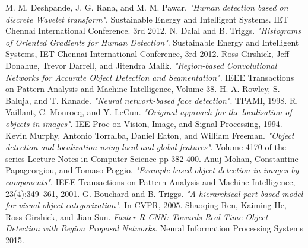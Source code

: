 \begin{thebibliography}{1}

M. M. Deshpande, J. G. Rana, and M. M. Pawar. \emph{"Human detection based on discrete Wavelet transform"}. Sustainable Energy and Intelligent Systems. IET Chennai International Conference. 3rd 2012.
N. Dalal and  B. Triggs. \emph{"Histograms of Oriented Gradients for Human Detection"}. Sustainable Energy and Intelligent Systems, IET Chennai International Conference, 3rd 2012.
Ross Girshick, Jeff Donahue, Trevor Darrell, and Jitendra Malik. \emph{"Region-based Convolutional Networks for Accurate Object Detection and Segmentation"}. IEEE Transactions on Pattern Analysis and Machine Intelligence, Volume 38.
H. A. Rowley, S. Baluja, and T. Kanade. \emph{"Neural network-based face detection"}. TPAMI, 1998.
R. Vaillant, C. Monrocq, and Y. LeCun. \emph{"Original approach for the localisation of objects in images"}. IEE Proc on Vision, Image, and
Signal Processing, 1994.
Kevin Murphy, Antonio Torralba, Daniel Eaton, and William Freeman. \emph{"Object detection and localization using local and global features"}. Volume 4170 of the series Lecture Notes in Computer Science pp 382-400.
Anuj Mohan, Constantine Papageorgiou, and Tomaso Poggio. \emph{"Example-based object detection in images by components"}. IEEE Transactions on Pattern Analysis and Machine Intelligence, 23(4):349–361, 2001.
G. Bouchard and B. Triggs. \emph{"A hierarchical part-based model for visual object categorization"}. In CVPR, 2005.
Shaoqing Ren, Kaiming He, Ross Girshick, and Jian Sun. \emph{Faster R-CNN: Towards Real-Time Object	Detection with Region Proposal Networks}. Neural Information Processing Systems 2015.
\end{thebibliography}